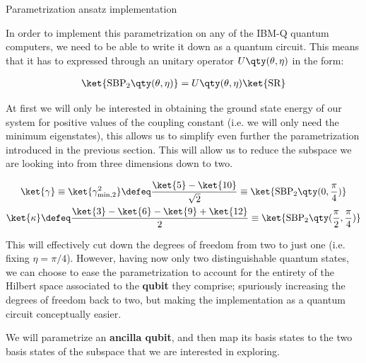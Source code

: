 \begin{frame}[allowframebreaks]{Parametrization ansatz implementation}

	In order to implement this parametrization on any of the IBM-Q quantum computers, we need to be able to write it down as a quantum circuit. This means that it has to expressed through an unitary operator $U\qty(\theta, \eta)$ in the form:

	\begin{gather}
	  \ket{\text{SBP}_{2} \qty(\theta, \eta)} =
	    U\qty(\theta, \eta) \ket{\text{SR}}
	\end{gather}

	At first we will only be interested in obtaining the ground state energy of our system for positive values of the coupling constant (i.e. we will only need the minimum eigenstates), this allows us to simplify even further the parametrization introduced in the previous section. This will allow us to reduce the subspace we are looking into from three dimensions down to two.

	\begin{gather}
	  \ket{\gamma} \equiv
	    \ket{\gamma_{\text{min},2}^2} \defeq
	    \frac{\ket{5} - \ket{10}}{\sqrt{2}} \equiv
	    \ket{\text{SBP}_{2} \qty(0, \frac{\pi}{4})} \\
	  \ket{\kappa} \defeq
	    \frac{\ket{3}-\ket{6}-\ket{9}+\ket{12}}{2} \equiv
	    \ket{\text{SBP}_{2} \qty(\frac{\pi}{2}, \frac{\pi}{4})}
	\end{gather}

\break

	\begin{multicols}{2}

		This will effectively cut down the degrees of freedom from two to just one (i.e. fixing $\eta=\pi/4$). However, having now only two distinguishable quantum states, we can choose to ease the parametrization to account for the entirety of the Hilbert space associated to the \textbf{qubit} they comprise; spuriously increasing the degrees of freedom back to two, but making the implementation as a quantum circuit conceptually easier.

		\medskip

		We will parametrize an \textbf{ancilla qubit}, and then map its basis states to the two basis states of the subspace that we are interested in exploring.


\end{multicols}
\end{frame}

